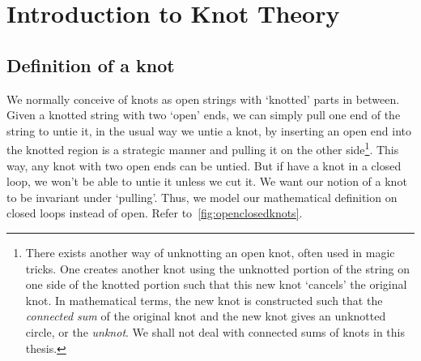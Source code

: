 \chapter{Introduction to Knot Theory}

\section{Definition of a knot}

We normally conceive of knots as open strings with `knotted' parts in between. Given a knotted string with two `open' ends, we can simply pull one end of the string to untie it, in the usual way we untie a knot, by inserting an open end into the knotted region is a strategic manner and pulling it on the other side\footnote{There exists another way of unknotting an open knot, often used in magic tricks. One creates another knot using the unknotted portion of the string on one side of the knotted portion such that this new knot `cancels' the original knot. In mathematical terms, the new knot is constructed such that the \textit{connected sum} of the original knot and the new knot gives an unknotted circle, or the \textit{unknot}. We shall not deal with connected sums of knots in this thesis.}. This way, any knot with two open ends can be untied. But if have a knot in a closed loop, we won't be able to untie it unless we cut it. We want our notion of a knot to be invariant under `pulling'. Thus, we model our mathematical definition on closed loops instead of open. Refer to~\cref{fig:openclosedknots}.

